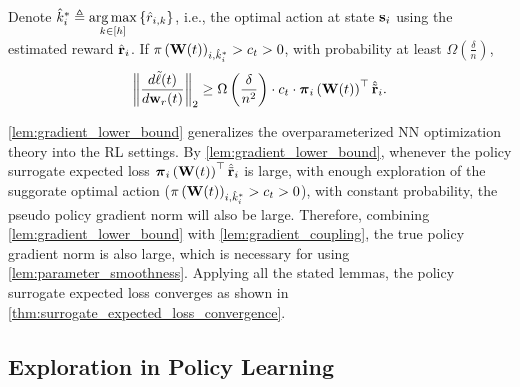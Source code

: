\begin{lem}
\label{lem:gradient_lower_bound}
	Denote $\hat{k}_i^* \triangleq \operatorname*{arg\,max}\limits_{ k \in [h]}{\left\{ \hat{r}_{i, k} \right\}}$, i.e., the optimal action at state ${\mathbf{s}}_{i}$ using the estimated reward ${\hat{\mathbf{r}}}_i$. If $\pi\left({\mathbf{W}}(t)\right)_{i, \hat{k}_i^*} > c_t > 0$, with probability at least $\Omega\left( \frac{\delta}{n} \right)$,
\begin{equation*}
\begin{split}
	\left\| \frac{d\tilde{\ell}(t)}{d {\mathbf{w}}_r(t)} \right\|_2 \ge \Omega\left( \frac{\delta}{n^2} \right) \cdot c_t \cdot  {\boldsymbol{\pi}}_i\left( {\mathbf{W}}(t) \right)^\top \hat{{\tilde{\mathbf{r}}}}_{i}.
\end{split}
\end{equation*}
\end{lem}

\cref{lem:gradient_lower_bound} generalizes the overparameterized NN optimization theory into the RL settings. By \cref{lem:gradient_lower_bound}, whenever the policy surrogate expected loss ${\boldsymbol{\pi}}_i\left( {\mathbf{W}}(t) \right)^\top \hat{{\tilde{\mathbf{r}}}}_{i}$ is large, with enough exploration of the suggorate optimal action ($\pi\left({\mathbf{W}}(t)\right)_{i, \hat{k}_i^*} > c_t > 0$), with constant probability, the pseudo policy gradient norm will also be large. Therefore, combining \cref{lem:gradient_lower_bound} with \cref{lem:gradient_coupling}, the true policy gradient norm is also large, which is necessary for using \cref{lem:parameter_smoothness}. Applying all the stated lemmas, the policy surrogate expected loss converges as shown in \cref{thm:surrogate_expected_loss_convergence}.

\subsection{Exploration in Policy Learning}
\label{subsec:exploration_in_policy_learning}

